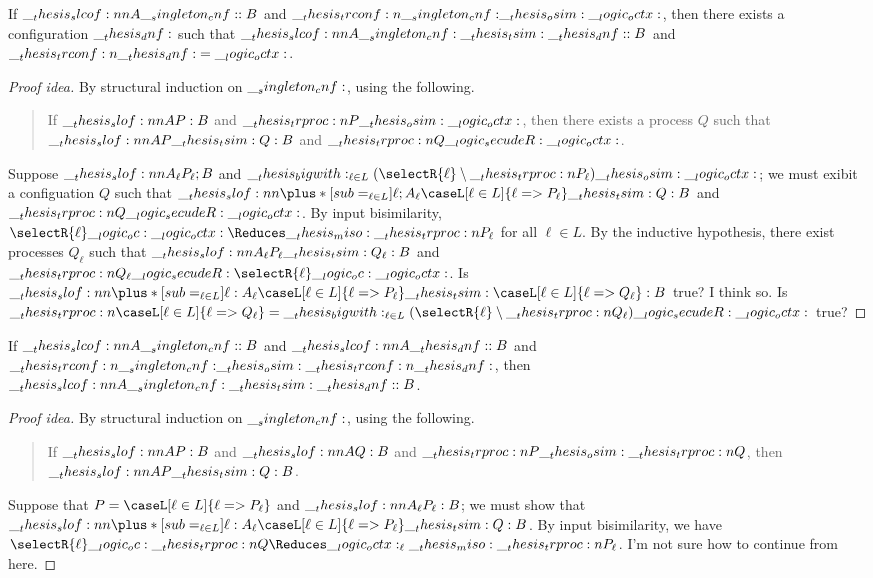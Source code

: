 \begin{conjecture}
  If $\slcof{A |- \cnf : B}$ and $\__thesis_trconf:n {\__singleton_cnf:} \__thesis_osim: \__logic_octx:$, then there exists a configuration $\__thesis_dnf:$ such that $\slcof{A |- \cnf \tsim \dnf : B}$ and $\__thesis_trconf:n {\__thesis_dnf:} = \__logic_octx:$.
\end{conjecture}
\begin{proof}[Proof idea]
  By structural induction on $\__singleton_cnf:$, using the following.
  \begin{quotation}
    If $\slof{A |- P : B}$ and $\__thesis_trproc:n {P} \__thesis_osim: \__logic_octx:$, then there exists a process $Q$ such that $\slof{A |- P \tsim Q : B}$ and $\__thesis_trproc:n {Q} \__logic_secudeR: \__logic_octx:$.
  \end{quotation}

  Suppose $\slof{A_{\ell} |- P_{\ell} ; B}$ and $\bigwith_{\ell \in L}(\selectR{\ell} \limp \trproc{P_{\ell}}) \osim \octx$; we must exibit a configuation $Q$ such that $\slof{\plus*[sub=_{\ell \in L}]{\ell;A_{\ell}} |- \caseL[\ell \in L]{\ell => P_{\ell}} \tsim Q : B}$ and $\__thesis_trproc:n {Q} \__logic_secudeR: \__logic_octx:$.
  By input bisimilarity, $\selectR{\ell} \oc \octx \Reduces\miso \trproc{P_{\ell}}$ for all $\ell \in L$.
  By the inductive hypothesis, there exist processes $Q_{\ell}$ such that $\slof{A_{\ell} |- P_{\ell} \tsim Q_{\ell} : B}$ and $\trproc{Q_{\ell}} \secudeR \selectR{\ell} \oc \octx$.
  Is $\slof{\plus*[sub=_{\ell \in L}]{\ell:A_{\ell}} |- \caseL[\ell \in L]{\ell => P_{\ell}} \tsim \caseL[\ell \in L]{\ell => Q_{\ell}} : B}$ true?
  I think so. 
  Is $\trproc{\caseL[\ell \in L]{\ell => Q_{\ell}}} = \bigwith_{\ell \in L}(\selectR{\ell} \limp \trproc{Q_{\ell}}) \secudeR \octx$ true?
\end{proof}


\begin{conjecture}
  If $\slcof{A |- \cnf : B}$ and $\slcof{A |- \dnf : B}$ and $\__thesis_trconf:n {\__singleton_cnf:} \__thesis_osim: \__thesis_trconf:n {\__thesis_dnf:}$, then $\slcof{A |- \cnf \tsim \dnf : B}$.
\end{conjecture}
\begin{proof}[Proof idea]
  By structural induction on $\__singleton_cnf:$, using the following.
  \begin{quotation}
    If $\slof{A |- P : B}$ and $\slof{A |- Q : B}$ and $\__thesis_trproc:n {P} \__thesis_osim: \__thesis_trproc:n {Q}$, then $\slof{A |- P \tsim Q : B}$.
  \end{quotation}

  Suppose that $P = \caseL[\ell \in L]{\ell => P_{\ell}}$ and $\slof{A_{\ell} |- P_{\ell} : B}$; we must show that $\slof{\plus*[sub=_{\ell \in L}]{\ell:A_{\ell}} |- \caseL[\ell \in L]{\ell => P_{\ell}} \tsim Q : B}$.
  By input bisimilarity, we have $\selectR{\ell} \oc \trproc{Q} \Reduces \octx_{\ell} \miso \trproc{P_{\ell}}$.
  I'm not sure how to continue from here.
\end{proof}


